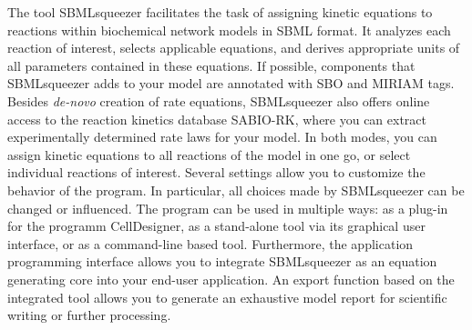 The tool SBMLsqueezer facilitates the task of assigning kinetic equations to
reactions within biochemical network models in SBML format.
It analyzes each reaction of interest, selects applicable equations, and derives
appropriate units of all parameters contained in these equations.
If possible, components that SBMLsqueezer adds to your model are annotated with
SBO and MIRIAM tags.
Besides \emph{de-novo} creation of rate equations, SBMLsqueezer also offers
online access to the reaction kinetics database SABIO-RK, where you can extract
experimentally determined rate laws for your model.
In both modes, you can assign kinetic equations to all reactions of the model in
one go, or select individual reactions of interest. 
Several settings allow you to customize the behavior of the program.
In particular, all choices made by SBMLsqueezer can be changed or influenced.
The program can be used in multiple ways: as a plug-in for the programm
CellDesigner, as a stand-alone tool via its graphical user interface, or as a
command-line based tool.
Furthermore, the application programming interface allows you to integrate
SBMLsqueezer as an equation generating core into your end-user application.
An export function based on the integrated tool \SBMLLaTeX{} allows you to
generate an exhaustive model report for scientific writing or further
processing.
